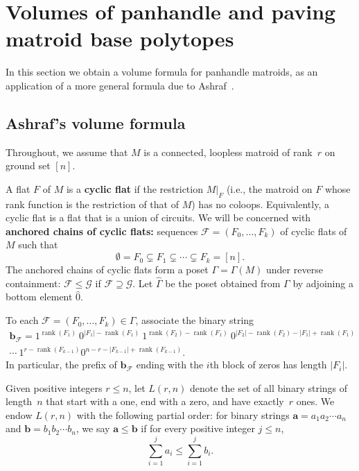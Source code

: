 \documentclass[11pt]{amsart}
\theoremstyle{definition}
\newcommand{\0}{\emptyset}
\newcommand{\F}{\mathcal{F}}
\newcommand{\G}{\mathcal{G}}
\newcommand{\defterm}[1]{\textbf{#1}}
\DeclareMathOperator{\rank}{\operatorname{rank}}
\begin{document}

\section{Volumes of panhandle and paving matroid base polytopes}\label{sec:volumes}

In this section we obtain a volume formula for panhandle matroids, as an application of a more general formula due to Ashraf~\cite{Ashraf}.

\subsection{Ashraf's volume formula} \label{sec:Ashraf}
Throughout, we assume that $M$ is a connected, loopless matroid of rank~$r$ on ground set $[n]$.

A flat $F$ of $M$ is a \defterm{cyclic flat} if the restriction $ M|_F $ (i.e., the matroid on $F$ whose rank function is the restriction of that of $M$) has no coloops.
Equivalently, a cyclic flat is a flat that is a union of circuits.
We will be concerned with \defterm{anchored chains of cyclic flats:} sequences $\F=(F_0,\dots,F_k)$ of cyclic flats of $M$ such that
\[\0=F_0 \subsetneq F_1 \subsetneq \cdots \subsetneq F_k=[n].\]
The anchored chains of cyclic flats form a poset $\Gamma=\Gamma(M)$ under reverse containment: $ \F \leq \G $ if $\F\supseteq\G$.
Let $\hat\Gamma$ be the poset obtained from $\Gamma$ by adjoining a bottom element $ \hat{0} $.

\renewcommand{\aa}{\mathbf{a}}
\newcommand{\bb}{\mathbf{b}}
To each $\F=(F_0,\dots,F_k)\in\Gamma$, associate the binary string
\begin{multline*}
\bb_\F =
1^{\rank(F_1)} \
0^{|F_1|-\rank(F_1)} \
1^{\rank(F_2)-\rank(F_1)} \
0^{|F_2|-\rank(F_2)-|F_1|+\rank(F_1)} \\
\cdots \
1^{r-\rank(F_{k-1})}
0^{n-r-|F_{k-1}|+\rank(F_{k-1})}.
\end{multline*}
In particular, the prefix of $\bb_\F$ ending with the $i$th block of zeros has length $|F_i|$.

Given positive integers $r \leq n$, let $L(r,n)$ denote the set of all binary strings of length~$n$ that start with a one, end with a zero, and have exactly~$r$ ones.
We endow $ L(r,n) $ with the following partial order: for binary strings $ \aa = a_1 a_2 \cdots a_n $ and $ \bb = b_1 b_2 \cdots b_n $, we say $ \aa \leq \bb $ if for every positive integer $ j \leq n $,
\[
\sum_{i = 1}^{j} a_{i} \leq \sum_{i = 1}^{j} b_{i}.
\]
\end{document}
